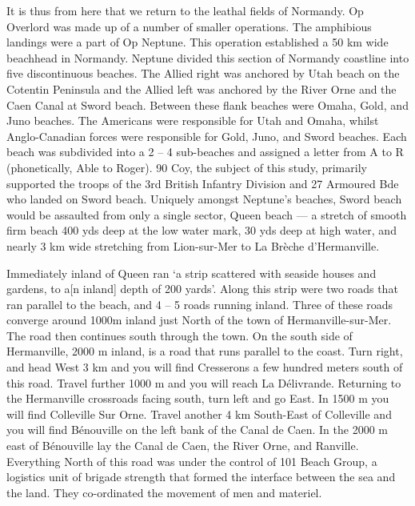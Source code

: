 \documentclass[noraggedright]{turabian-researchpaper}
\newcommand{\EightOverlordInt}{Diaries for May, Operation Overlord 
\textit{8 British Infantry Brigade Intelligence Summary}}
\begin{document}
It is thus from here that we return to the leathal fields of Normandy.
Op Overlord was made up of a number of smaller operations.  The amphibious
landings were a part of Op Neptune.  This operation established a 50 km wide 
beachhead in Normandy.  Neptune divided this section of Normandy coastline 
into five discontinuous beaches.  The Allied right was anchored by Utah beach 
on the Cotentin Peninsula and the Allied left was anchored by the River Orne 
and the Caen Canal at Sword beach.  Between these flank beaches were Omaha, 
Gold, and Juno beaches.  The Americans were responsible for Utah and Omaha, 
whilst Anglo-Canadian forces were responsible for Gold, Juno, and Sword 
beaches.  Each beach was subdivided into a 2 -- 4 sub-beaches and assigned a 
letter from A to R (phonetically, Able to Roger).  90 Coy, the subject of 
this study, primarily supported the troops of the 3rd British Infantry 
Division and 27 Armoured Bde who landed on Sword beach.  Uniquely amongst 
Neptune's beaches, Sword beach would be assaulted from only a single sector,
Queen beach ---  a stretch of smooth firm beach 400 yds deep at the low water 
mark, 30 yds deep at high water, and nearly 3 km wide stretching from 
Lion-sur-Mer to La Brèche d'Hermanville.\autocite[\EightOverlordInt][Para 1a]
{8bdewd}

Immediately inland of Queen ran `a strip scattered with seaside houses and
gardens, to a[n inland] depth of 200 yards'.\autocite [\EightOverlordInt]
[Para 3a]{8bdewd} Along this strip were two roads that ran parallel to the 
beach, and 4 -- 5 roads running inland.  Three of these roads converge around 
1000m inland just North of the town of Hermanville-sur-Mer.  The road then 
continues south through the town.  On the south side of Hermanville, 2000 m 
inland, is a road that runs parallel to the coast. Turn right, and head West 
3 km and you will find Cresserons a few hundred meters south of this road.  
Travel further 1000 m and you will reach La Délivrande.  Returning to the 
Hermanville crossroads facing south, turn left and go East.  In 1500 m you 
will find Colleville Sur Orne. Travel another 4 km South-East of Colleville 
and you will find Bénouville on the left bank of the Canal de Caen.  In the 
2000 m east of Bénouville lay the Canal de Caen, the River Orne, and Ranville.
Everything North of this road was under the control of 101 Beach Group, a 
logistics unit of brigade strength that formed the interface between the sea 
and the land.  They co-ordinated the movement of men and materiel. %
\end{document}
